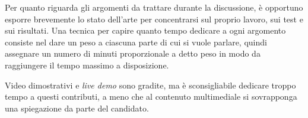 Per quanto riguarda gli argomenti da trattare durante la discussione, è opportuno esporre brevemente lo stato dell'arte per concentrarsi sul proprio lavoro, sui test e sui risultati. Una tecnica per capire quanto tempo dedicare a ogni argomento consiste nel dare un peso a ciascuna parte di cui si vuole parlare, quindi assegnare un numero di minuti proporzionale a detto peso in modo da raggiungere il tempo massimo a disposizione.

Video dimostrativi e \textit{live demo} sono gradite, ma è sconsigliabile dedicare troppo tempo a questi contributi, a meno che al contenuto multimediale si sovrapponga una spiegazione da parte del candidato.
